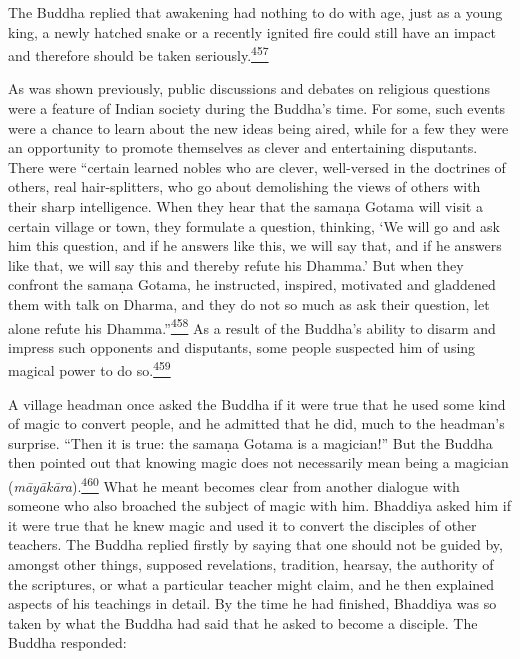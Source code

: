 The Buddha replied that awakening had nothing to do with age, just as a
young king, a newly hatched snake or a recently ignited fire could still
have an impact and therefore should be taken
seriously.\label{footprints_split_013.html_fnref457}\hyperref[footprints_split_025.htmlux5cux23fn457]{\textsuperscript{457}}

As was shown previously, public discussions and debates on religious
questions were a feature of Indian society during the Buddha's time. For
some, such events were a chance to learn about the new ideas being
aired, while for a few they were an opportunity to promote themselves as
clever and entertaining disputants. There were ``certain learned nobles
who are clever, well-versed in the doctrines of others, real
hair-splitters, who go about demolishing the views of others with their
sharp intelligence. When they hear that the samaṇa Gotama will visit a
certain village or town, they formulate a question, thinking, `We will
go and ask him this question, and if he answers like this, we will say
that, and if he answers like that, we will say this and thereby refute
his Dhamma.' But when they confront the samaṇa Gotama, he instructed,
inspired, motivated and gladdened them with talk on Dharma, and they do
not so much as ask their question, let alone refute his
Dhamma.''\label{footprints_split_013.html_fnref458}\hyperref[footprints_split_025.htmlux5cux23fn458]{\textsuperscript{458}}
As a result of the Buddha's ability to disarm and impress such opponents
and disputants, some people suspected him of using magical power to do
so.\label{footprints_split_013.html_fnref459}\hyperref[footprints_split_025.htmlux5cux23fn459]{\textsuperscript{459}}

A village headman once asked the Buddha if it were true that he used
some kind of magic to convert people, and he admitted that he did, much
to the headman's surprise. ``Then it is true: the samaṇa Gotama is a
magician!'' But the Buddha then pointed out that knowing magic does not
necessarily mean being a magician
(\emph{māyākāra}).\label{footprints_split_013.html_fnref460}\hyperref[footprints_split_025.htmlux5cux23fn460]{\textsuperscript{460}}
What he meant becomes clear from another dialogue with someone who also
broached the subject of magic with him. Bhaddiya asked him if it were
true that he knew magic and used it to convert the disciples of other
teachers. The Buddha replied firstly by saying that one should not be
guided by, amongst other things, supposed revelations, tradition,
hearsay, the authority of the scriptures, or what a particular teacher
might claim, and he then explained aspects of his teachings in detail.
By the time he had finished, Bhaddiya was so taken by what the Buddha
had said that he asked to become a disciple. The Buddha responded:

